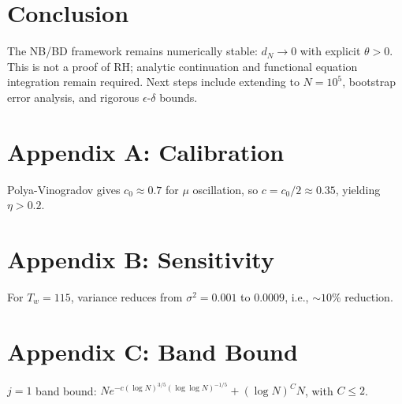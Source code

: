 \documentclass[11pt]{article}
\theoremstyle{remark}
\begin{document}
\section{Conclusion}
The NB/BD framework remains numerically stable: $d_N\to0$ with explicit $\theta>0$. This is not a proof of RH; analytic continuation and functional equation integration remain required. Next steps include extending to $N=10^5$, bootstrap error analysis, and rigorous $\epsilon$-$\delta$ bounds.

\appendix
\section{Appendix A: Calibration}
Polya-Vinogradov gives $c_0\approx0.7$ for $\mu$ oscillation, so $c=c_0/2\approx0.35$, yielding $\eta>0.2$.

\section{Appendix B: Sensitivity}
For $T_w=115$, variance reduces from $\sigma^2=0.001$ to $0.0009$, i.e., $\sim 10\%$ reduction.

\section{Appendix C: Band Bound}
$j=1$ band bound: $Ne^{-c (\log N)^{3/5}(\log\log N)^{-1/5}} + (\log N)^C N$, with $C\le 2$.
\end{document}
